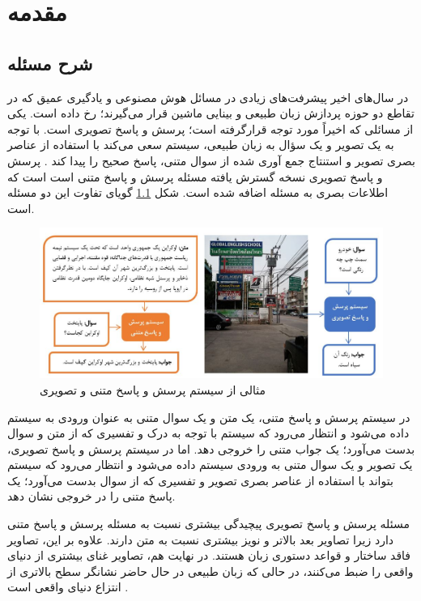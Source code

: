 

\chapter{مقدمه}
\thispagestyle{empty}
\section{شرح مسئله}

در سال‌های اخیر پیشرفت‌های زیادی در مسائل هوش مصنوعی و یادگیری عمیق که در تقاطع دو حوزه پردازش زبان طبیعی  و بینایی ماشین  قرار می‌گیرند؛ رخ داده است. یکی از مسائلی که اخیراً مورد توجه قرارگرفته است؛ پرسش و پاسخ تصویری  است. با توجه به یک تصویر و یک سؤال به زبان طبیعی، سیستم سعی می‌کند با استفاده از عناصر بصری تصویر و استنتاج جمع آوری شده از سوال متنی، پاسخ صحیح را پیدا کند 
	\cite{manmadhan2020visual}.
پرسش و پاسخ تصویری نسخه گسترش یافته مسئله پرسش و پاسخ متنی  است است که اطلاعات بصری به مسئله اضافه شده است. شکل \ref{fig:VQAExample}  گویای تفاوت این دو مسئله است.
	\begin{figure}
		\centerline{\includegraphics[scale=0.7]{images/1.JPG}}
		\caption{مثالی از سیستم پرسش و پاسخ متنی و تصویری}
		\label{fig:VQAExample}
	\end{figure}
	
	در سیستم پرسش و پاسخ متنی، یک متن و یک سوال متنی به عنوان ورودی به سیستم داده می‌شود و انتظار می‌رود که سیستم با توجه به درک و تفسیری که از متن و سوال بدست می‌آورد؛ یک جواب متنی را خروجی دهد. اما در سیستم پرسش و پاسخ تصویری، یک تصویر و یک سوال متنی به ورودی سیستم داده می‌شود و انتظار می‌رود که سیستم بتواند با استفاده از عناصر بصری تصویر و تفسیری که از سوال بدست می‌آورد؛ یک پاسخ متنی را در خروجی نشان دهد.
	
	مسئله پرسش و پاسخ تصویری پیچیدگی بیشتری نسبت به مسئله پرسش و پاسخ متنی دارد زیرا تصاویر بعد بالاتر و نویز بیشتری نسبت به متن دارند. علاوه بر این، تصاویر فاقد ساختار و قواعد دستوری زبان هستند. در نهایت هم، تصاویر غنای بیشتری از دنیای واقعی را ضبط می‌کنند، در حالی که زبان طبیعی در حال حاضر نشانگر سطح بالاتری از انتزاع دنیای واقعی است
	\cite{wu2017visual}.
	


